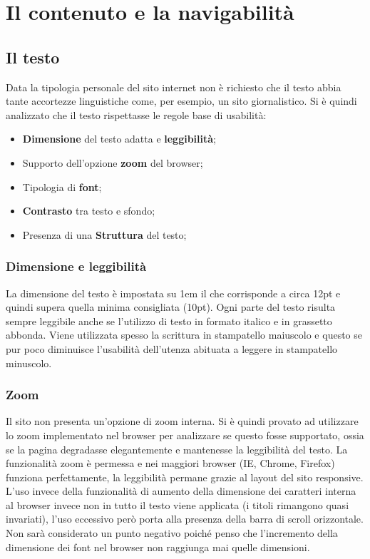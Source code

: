 
\section{Il contenuto e la navigabilità}

	\subsection{Il testo}
		Data la tipologia personale del sito internet non è richiesto che il testo abbia tante accortezze linguistiche come, per esempio, un sito giornalistico. Si è quindi analizzato che il testo rispettasse le regole base di usabilità:
		\begin{itemize}
			\item \textbf{Dimensione} del testo adatta e \textbf{leggibilità};
			\item Supporto dell'opzione \textbf{zoom} del browser;
			\item Tipologia di \textbf{font};
			\item \textbf{Contrasto} tra testo e sfondo;
			\item Presenza di una \textbf{Struttura} del testo;
		\end{itemize}
		
		\subsubsection{Dimensione e leggibilità}
			La dimensione del testo è impostata su 1em il che corrisponde a circa 12pt e quindi supera quella minima consigliata (10pt). Ogni parte del testo risulta sempre leggibile anche se l'utilizzo di testo in formato italico e in grassetto abbonda. Viene utilizzata spesso la scrittura in stampatello maiuscolo e questo se pur poco diminuisce l'usabilità dell'utenza abituata a leggere in stampatello minuscolo.
			
		\subsubsection{Zoom}
			Il sito non presenta un'opzione di zoom interna. Si è quindi provato ad utilizzare lo zoom implementato nel browser per analizzare se questo fosse supportato, ossia se la pagina degradasse elegantemente e mantenesse la leggibilità del testo. 
			La funzionalità zoom è permessa e nei maggiori browser (IE, Chrome, Firefox) funziona perfettamente, la leggibilità permane grazie al layout del sito responsive.
			L'uso invece della funzionalità di aumento della dimensione dei caratteri interna al browser invece non in tutto il testo viene applicata (i titoli rimangono quasi invariati), l'uso eccessivo però porta alla presenza della barra di scroll orizzontale. Non sarà considerato un punto negativo poiché penso che l'incremento della dimensione dei font nel browser non raggiunga mai quelle dimensioni.
	
